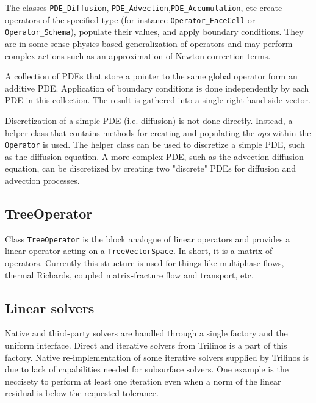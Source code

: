 {The classes {\tt PDE\_Diffusion}, {\tt PDE\_Advection},{\tt PDE\_Accumulation}, etc create 
operators of the specified type (for instance 
{\tt Operator\_FaceCell} or {\tt Operator\_Schema}), populate their values, and
apply boundary conditions.
They are in some sense physics based generalization of operators and may perform complex actions
such as an approximation of Newton correction terms.

A collection of PDEs that store a pointer to the same global operator form an additive PDE.
Application of boundary conditions is done independently by each PDE in this collection.
The result is gathered into a single right-hand side vector.


Discretization of a simple 
PDE (i.e. diffusion) is not done directly. 
Instead, a helper class that contains methods for creating and populating 
the {\it ops} within the {\tt Operator} is used. 
The helper class can be used to discretize a simple PDE, such as the diffusion equation.
A more complex PDE, such as the advection-diffusion equation, can be discretized 
by creating two "discrete" PDEs for diffusion and advection processes.


\subsection{TreeOperator}
Class {\tt TreeOperator} is the block analogue of linear operators and 
provides a linear operator acting on a {\tt TreeVectorSpace}. 
In short, it is a matrix of operators.
Currently this structure is used for things like multiphase flows, 
thermal Richards, coupled matrix-fracture flow and transport, etc.


\subsection{Linear solvers}
Native and third-party solvers are handled through a single factory and 
the uniform interface.
Direct and iterative solvers from Trilinos is a part of this factory.
Native re-implementation of some iterative solvers supplied by Trilinos
is due to lack of capabilities needed for subsurface solvers.
One example is the neccisety to perform at least one iteration even when
a norm of the linear residual is below the requested tolerance.


}
